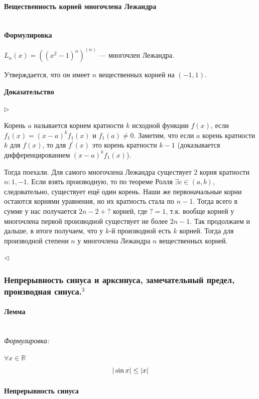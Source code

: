 \documentclass{article}
\let\vanillaparagraph\paragraph
\renewcommand{\paragraph}[1]{\vanillaparagraph{#1}\mbox{}\\}
\begin{document}
\paragraph{Вещественность корней многочлена Лежандра}
\textbf{Формулировка}

$L_n(x) = \left((x^2-1)^n\right)^{(n)}$ --- многочлен Лежандра.

Утверждается, что он имеет $n$ вещественных корней на $(-1, 1)$.

\textbf{Доказательство}

$\rhd$

Корень $a$ называется корнем кратности $k$ исходной функции $f(x)$, если $f_1(x) = (x - a)^kf_1(x)$ и $f_1(a) \neq 0$. Заметим, что если $a$ корень кратности $k$ для $f(x)$, то для $f^\prime(x)$ это корень кратности $k - 1$ (доказывается дифференцированием $(x - a)^kf_1(x)$).

Тогда поехали. Для самого многочлена Лежандра существует 2 корня кратности $n: {1, -1}$. Если взять производную, то по теореме Ролля $\exists c \in (a, b)$, следовательно, существует ещё один корень. Наши же первоначальные корни остаются корнями уравнения, но их кратность стала по $n-1$. Тогда всего в сумме у нас получается $2n - 2 + ?$ корней, где $? = 1$, т.к. вообще корней у многочлена первой производной существует не более $2n - 1$. Так продолжаем и дальше, в итоге получаем, что у $k$-й производной есть $k$ корней. Тогда для производной степени $n$ у многочлена Лежандра $n$ вещественных корней.

$\lhd$

\subsubsection{Непрерывность синуса и арксинуса, замечательный предел, производная синуса.\texorpdfstring{$^3$}{}}

\paragraph{Лемма}

\textit{Формулировка: }

$\forall x \in \mathbb{R}$
\begin{equation}
|\sin{x}| \leq |x| \notag
\end{equation}

\paragraph{Непрерывность синуса}
\end{document}
